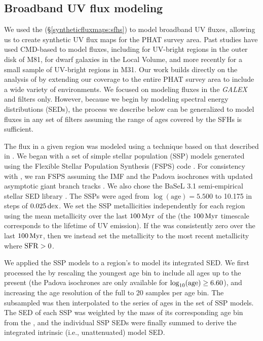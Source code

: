\documentclass[iop, tighten]{emulateapj}
\begin{document}
\subsection{Broadband UV flux modeling}\label{syntheticfluxmaps:fluxmod}

We used the  (\S \ref{syntheticfluxmaps:sfhs}) to model broadband UV
fluxes, allowing us to create synthetic UV flux maps for the PHAT survey area.
Past studies have used CMD-based  to model fluxes, including
\citet{Gogarten:2009} for UV-bright regions in the outer disk of M81,
\citet{Johnson:2013} for dwarf galaxies in the Local Volume, and more recently
\citet{Simones:2014} for a small sample of UV-bright regions in M31. Our work
builds directly on the analysis of \citet{Simones:2014} by extending our
coverage to the entire PHAT survey area to include a wide variety of
environments. We focused on modeling fluxes in the \emph{GALEX} \fuv{} and
\nuv{} filters only. However, because we begin by modeling spectral energy
distributions (SEDs), the process we describe below can be generalized to model
fluxes in any set of filters assuming the range of ages covered by the SFHs is
sufficient.

The flux in a given region was modeled using a technique based on that described
in \citet{Johnson:2013}. We began with a set of simple stellar population (SSP)
models generated using the Flexible Stellar Population Synthesis (FSPS) code
\citep{Conroy:2009, Conroy:2010}. For consistency with \citet{Lewis:2015}, we
ran FSPS assuming the \citet{Kroupa:2001} IMF and the Padova isochrones
\citep{Marigo:2008} with updated asymptotic giant branch tracks
\citep{Girardi:2010}. We also chose the BaSeL 3.1 semi-empirical stellar SED
library \citep{Westera:2002}. The SSPs were aged from $\log(\mathrm{age})=5.500$
to 10.175 in steps of $0.025\,\mathrm{dex}$. We set the SSP metallicities independently
for each region using the mean metallicity over the last $100\,\mathrm{Myr}$ of the \sfh{}
(the $100\,\mathrm{Myr}$ timescale corresponds to the lifetime of UV emission). If the
\sfr{} was consistently zero over the last $100\,\mathrm{Myr}$, then we instead set the
metallicity to the most recent metallicity where $\mathrm{SFR} > 0$.

We applied the SSP models to a region's \sfh{} to model its integrated SED. We
first processed the \sfh{} by rescaling the youngest age bin to include all ages
up to the present (the Padova isochrones are only available for
$\log_{10}(\mathrm{age}) \ge 6.60$), and increasing the age resolution of the full
\sfh{} to 20 samples per age bin. The subsampled \sfh{} was then interpolated to
the series of ages in the set of SSP models. The SED of each SSP was weighted by
the mass of its corresponding age bin from the \sfh{}, and the individual SSP
SEDs were finally summed to derive the integrated intrinsic (i.e., unattenuated)
model SED.
\end{document}

